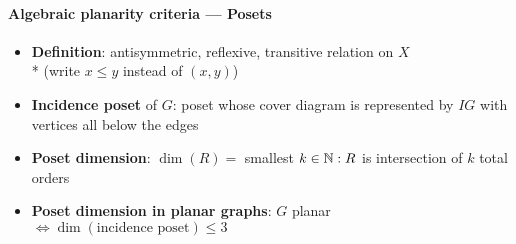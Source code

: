 


\paragraph{Algebraic planarity criteria --- Posets}
\begin{itemize}
  \item \textbf{Definition}: antisymmetric, reflexive, transitive relation on $ X $ \\* (write $ x \leq y $ instead of $ (x,y) $) 
  \item \textbf{Incidence poset} of $ G $: poset whose cover diagram is represented by $ IG $ with vertices all below the edges
  \item \textbf{Poset dimension}: $ \dim(R) = $ smallest $ k \in \mathbb{N} : R $ is intersection of $ k $ total orders
  \item \textbf{Poset dimension in planar graphs}: $ G $ planar $ \Leftrightarrow \dim(\text{incidence poset}) \leq 3 $
\end{itemize}
